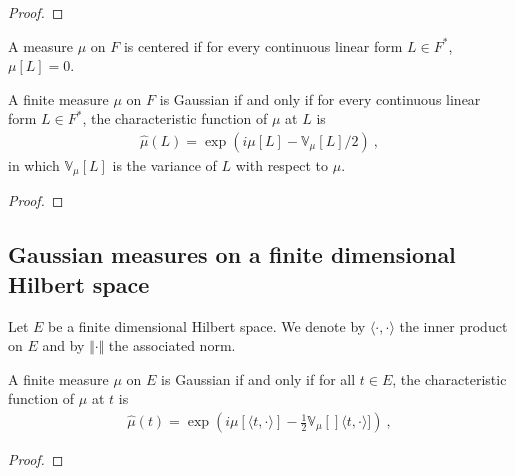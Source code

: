 \begin{proof}

\end{proof}


\begin{definition}\label{def:IsCentered}
A measure $\mu$ on $F$ is centered if for every continuous linear form $L \in F^*$, $\mu[L] = 0$.
\end{definition}


\begin{theorem}\label{thm:isGaussian_iff_charFunCLM_eq}
A finite measure $\mu$ on $F$ is Gaussian if and only if for every continuous linear form $L \in F^*$, the characteristic function of $\mu$ at $L$ is
\begin{align*}
  \hat{\mu}(L) = \exp\left(i \mu[L] - \mathbb{V}_\mu[L] / 2\right) \: ,
\end{align*}
in which $\mathbb{V}_\mu[L]$ is the variance of $L$ with respect to $\mu$.
\end{theorem}

\begin{proof}

\end{proof}


\subsection{Gaussian measures on a finite dimensional Hilbert space}

Let $E$ be a finite dimensional Hilbert space. We denote by $\langle \cdot, \cdot \rangle$ the inner product on $E$ and by $\Vert \cdot \Vert$ the associated norm.

\begin{lemma}\label{lem:isGaussian_iff_charFun_eq}
A finite measure $\mu$ on $E$ is Gaussian if and only if for all $t \in E$, the characteristic function of $\mu$ at $t$ is
\begin{align*}
  \hat{\mu}(t) = \exp\left(i \mu[\langle t, \cdot \rangle] - \frac{1}{2} \mathbb{V}_\mu[]\langle t, \cdot \rangle]\right) \: ,
\end{align*}
\end{lemma}

\begin{proof}

\end{proof}


